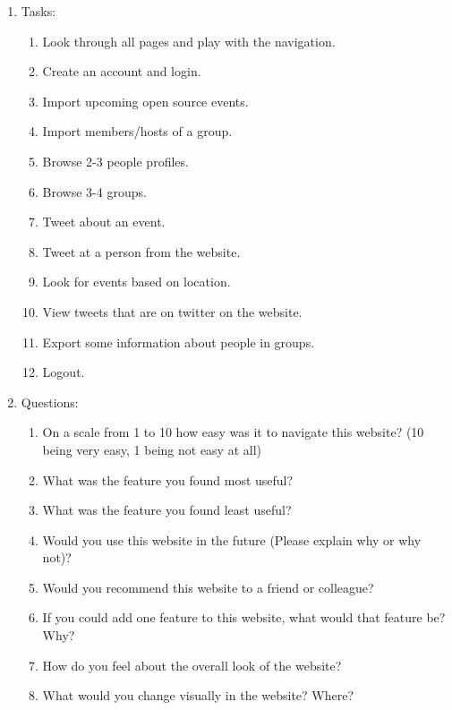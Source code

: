 \documentclass[draftclsnofoot,10pt,onecolumn]{IEEEtran} %
\begin{document}
\begin{enumerate}[label*=\arabic*.]
\begin{enumerate}
	\item Tasks:
	\begin{enumerate}
		\item Look through all pages and play with the navigation.
		\item Create an account and login.
		\item Import upcoming open source events.
		\item Import members/hosts of a group.
		\item Browse 2-3 people profiles.
		\item Browse 3-4 groups.
		\item Tweet about an event.
		\item Tweet at a person from the website.
		\item Look for events based on location.
		\item View tweets that are on twitter on the website.
		\item Export some information about people in groups.
		\item Logout. \\
	\end{enumerate}
	\item Questions:
	\begin{enumerate}
		\item On a scale from 1 to 10 how easy was it to navigate this website? (10
    being very easy, 1 being not easy at all)
  		\item What was the feature you found most useful?
  		\item What was the feature you found least useful?
  		\item Would you use this website in the future (Please explain why or why
    not)?
  		\item Would you recommend this website to a friend or colleague?
  		\item If you could add one feature to this website, what would that feature
    be? Why?
    		\item How do you feel about the overall look of the website?
    		\item What would you change visually in the website? Where? \\
	\end{enumerate}
\end{enumerate}


\end{enumerate}
\end{document}
